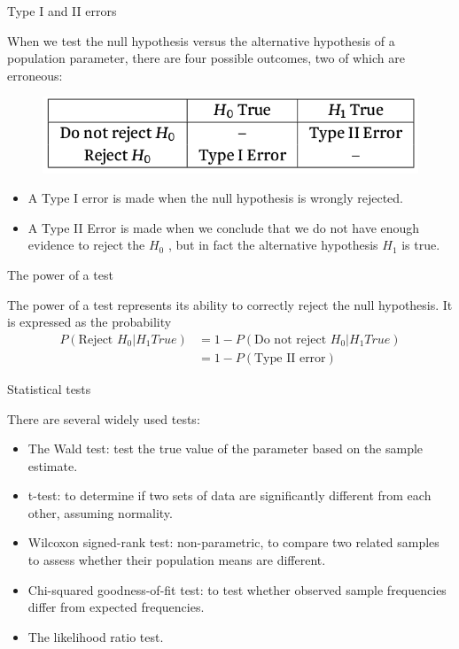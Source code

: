 \documentclass{beamer}
\begin{document}
\begin{frame}{Type I and II errors}

	When we test the null hypothesis versus the alternative hypothesis of a
	population parameter, there are four possible outcomes, two of which
	are erroneous:

	\begin{figure}
		\includegraphics[width=0.6\linewidth]{type.png}
	\end{figure}

	\small
	\begin{itemize}
		\item A Type I error is made when the null hypothesis is wrongly rejected.
		\item A Type II Error is made when we conclude that we do not have enough
evidence to reject the $H_0$ , but in fact the alternative hypothesis $H_1$ is true.
	\end{itemize}

\end{frame}

\begin{frame}{The power of a test}

	The power of a test represents its ability to correctly reject the null
	hypothesis. It is expressed as the probability
	\begin{align*}
		P(\text{Reject }H_0 | H_1 True) &= 1 - P(\text{Do not reject }H_0 | H_1 True) \\
					&= 1 - P(\text{Type II error}) 
	\end{align*}

\end{frame}

\begin{frame}{Statistical tests}

	There are several widely used tests:
	\begin{itemize}
		\item The Wald test: test the true value of the parameter based on the sample estimate.
		\item t-test: to determine if two sets of data are significantly different from each other, assuming normality.
		\item Wilcoxon signed-rank test: non-parametric, to compare two related samples to assess whether their population means are different.
		\item Chi-squared goodness-of-fit test: to test whether observed sample frequencies differ from expected frequencies.
		\item The likelihood ratio test.

	\end{itemize}

\end{frame}
\end{document}
